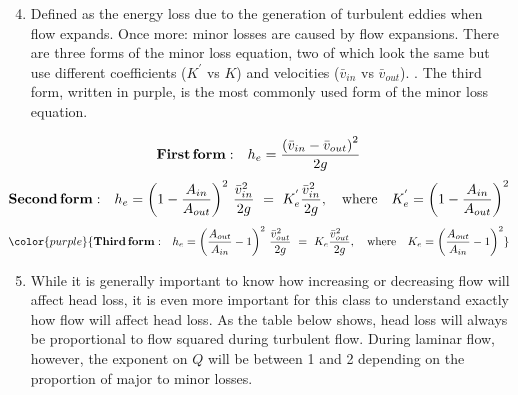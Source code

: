 \documentclass[letterpaper,10pt,english]{sphinxmanual}
\begin{document}
\begin{enumerate}
\setcounter{enumi}{3}
\item {} 
 Defined as the energy loss due to the generation of turbulent eddies when flow expands. Once more: minor losses are caused by flow expansions. There are three forms of the minor loss equation, two of which look the same but use different coefficients (\(K^{'}\) vs \(K\)) and velocities (\(\bar v_{in}\) vs \(\bar v_{out}\)). . The third form, written in purple, is the most commonly used form of the minor loss equation.

\end{enumerate}
\begin{equation}\label{equation:Review/Review_Fluid_Mechanics:Review/Review_Fluid_Mechanics:38}
\begin{split}{\rm{ \mathbf{First \, form:} }} \quad h_e = \frac{\left( \bar v_{in}  - \bar v_{out} \right)^2}{2g}\end{split}
\end{equation}\begin{equation}\label{equation:Review/Review_Fluid_Mechanics:Review/Review_Fluid_Mechanics:39}
\begin{split}{\rm{ \mathbf{Second \, form:} }} \quad h_e = \left( 1 - \frac{A_{in}}{A_{out}} \right)^2 \, \frac{\bar v_{in}^2}{2g} \, \, = \, \, K_e^{'} \frac{\bar v_{in}^2}{2g}, \quad {\rm where} \quad K_e^{'} = \left( 1 - \frac{A_{in}}{A_{out}} \right)^2\end{split}
\end{equation}\begin{equation}\label{equation:Review/Review_Fluid_Mechanics:Review/Review_Fluid_Mechanics:40}
\begin{split}\color{purple}{
{\rm{ \mathbf{Third \, form:} }} \quad h_e = \left( \frac{A_{out}}{A_{in}} -1 \right)^2 \, \frac{\bar  v_{out}^2}{2g} \, \, = \, \, K_e \frac{\bar v_{out}^2}{2g}, \quad {\rm where} \quad K_e = \left( \frac{A_{out}}{A_{in}} - 1 \right)^2
}\end{split}
\end{equation}\begin{enumerate}
\setcounter{enumi}{4}
\item {} 
 While it is generally important to know how increasing or decreasing flow will affect head loss, it is even more important for this class to understand exactly how flow will affect head loss. As the table below shows, head loss will always be proportional to flow squared during turbulent flow. During laminar flow, however, the exponent on \(Q\) will be between 1 and 2 depending on the proportion of major to minor losses.

\end{enumerate}
\end{document}
